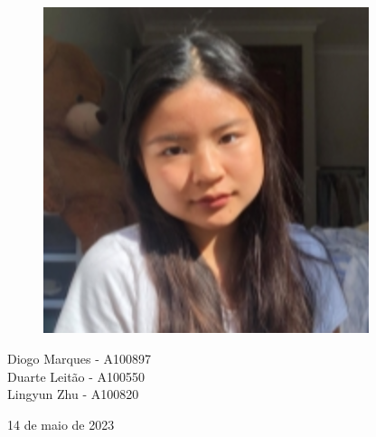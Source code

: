 \begin{titlepage}
\begin{figure}[hbt!]
        \begin{minipage}{0.333\textwidth}
            \centering
            {\includegraphics[width=0.85\textwidth]{imagens/3.png}}
        \end{minipage}
    \end{figure}

    \vspace*{1.5cm}
    
    \large Diogo Marques - A100897 \\
    \large Duarte Leitão - A100550 \\
    \large Lingyun Zhu - A100820 \\

    \vspace*{1cm}

    \large 14 de maio de 2023
\end{titlepage}
